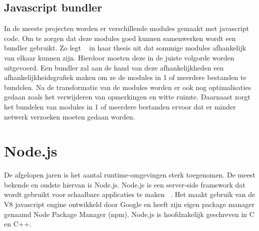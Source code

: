\subsection{Javascript bundler}
In de meeste projecten worden er verschillende modules gemaakt met javascript code. 
Om te zorgen dat deze modules goed kunnen samenwerken wordt een bundler gebruikt. 
Zo legt ~\textcite{Laurila2020} in haar thesis uit dat sommige modules afhankelijk van elkaar kunnen zijn. 
Hierdoor moeten deze in de juiste volgorde worden uitgevoerd. Een bundler zal aan de hand van deze afhankelijkheden 
een afhankelijkheidsgrafiek maken om ze de modules in 1 of meerdere bestanden te bundelen. 
Na de transformatie van de modules worden er ook nog optimalisaties gedaan zoals het verwijderen van opmerkingen en witte ruimte.
Daarnaast zorgt het bundelen van modules in 1 of meerdere bestanden ervoor dat er minder netwerk verzoeken moeten gedaan worden.

\section{Node.js}
De afgelopen jaren is het aantal runtime-omgevingen sterk toegenomen. De meest bekende en oudste hiervan is Node.js.
Node.js is een server-side framework dat wordt gebruikt voor schaalbare applicaties te maken ~\autocite{Gackenheimer2013}.
Het maakt gebruik van de V8 javascript engine ontwikkeld door Google en heeft zijn eigen package manager genaamd Node Package Manager (npm).
Node.js is hoofdzakelijk geschreven in C en C++.

